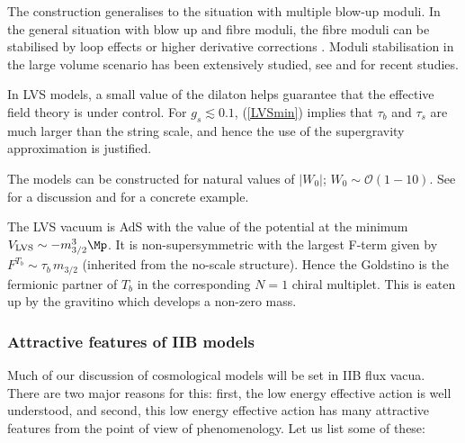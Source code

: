 \item The construction generalises to the situation with multiple blow-up moduli. In the general situation with blow up and fibre moduli, the fibre moduli can be stabilised by loop effects \cite{Cicoli:2008va} or higher derivative corrections \cite{Cicoli:2016chb}. Moduli stabilisation in the large volume scenario has been extensively studied, see \cite{Conlon:2005ki, Berg:2005yu, Berg:2007wt, Blumenhagen:2007sm, Conlon:2010ji, Cicoli:2011qg, Cicoli:2012vw,  Cicoli:2013mpa,  Cicoli:2013cha, Reece:2015qbf, Cicoli:2016xae, Cicoli:2017shd, Gallego:2017dvd, Cicoli:2017axo} and  \cite{AbdusSalam:2020ywo, Cicoli:2021dhg, Gao:2022fdi, Junghans:2022exo, Leontaris:2022rzj, Junghans:2022kxg} for recent studies.

\item In LVS models, a small value of the dilaton helps guarantee that the effective field theory is under control. For  $g_s\lesssim 0.1$, (\ref{LVSmin}) implies
that $\tau_b$ and $\tau_s$ are much larger than the string scale, and hence the use of the supergravity approximation is justified. 

\item The models can be constructed  for natural values of $|W_0|$; $W_0 \sim \mathcal{O}(1-10)$. See \cite{Cicoli:2013swa} for a discussion and  \cite{Louis:2012nb} for a concrete example. 

\item The LVS vacuum is AdS with the value of the potential at the minimum $V_{\rm LVS}\sim - m_{3/2}^3 \Mp$. It is  non-supersymmetric with the largest F-term given by $F^{T_b} \sim \tau_b \,m_{3/2}$ (inherited from the no-scale structure). Hence the Goldstino is the fermionic partner of $T_b$ in the corresponding $N=1$ chiral multiplet. This is eaten up by the gravitino which develops a non-zero mass.

\een

\subsubsection{Attractive features of IIB models}

Much of our discussion of cosmological models will be set in IIB flux vacua. There are two major reasons for this: first, the low energy effective action is well understood, and second, this low energy effective action has many attractive features from the point of view of phenomenology. Let us list some of these:

\ben

